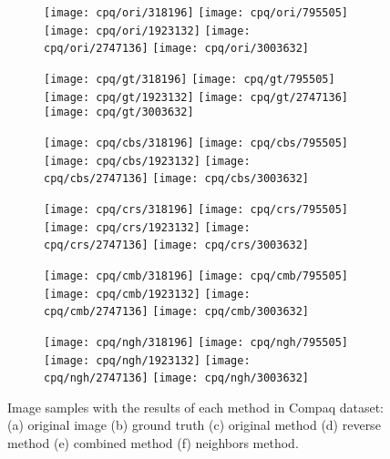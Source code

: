 \begin{figure*}[!htb]
    \centering
    \begin{subfigure}[t]{0.15\textwidth}
        \texttt{[image: cpq/ori/318196]}
        \texttt{[image: cpq/ori/795505]}
        \texttt{[image: cpq/ori/1923132]}
        \texttt{[image: cpq/ori/2747136]}
        \texttt{[image: cpq/ori/3003632]}
        \caption{}
    \end{subfigure}
    \begin{subfigure}[t]{0.15\textwidth}
        \texttt{[image: cpq/gt/318196]}
        \texttt{[image: cpq/gt/795505]}
        \texttt{[image: cpq/gt/1923132]}
        \texttt{[image: cpq/gt/2747136]}
        \texttt{[image: cpq/gt/3003632]}
        \caption{}
    \end{subfigure}
    \begin{subfigure}[t]{0.15\textwidth}
        \texttt{[image: cpq/cbs/318196]}
        \texttt{[image: cpq/cbs/795505]}
        \texttt{[image: cpq/cbs/1923132]}
        \texttt{[image: cpq/cbs/2747136]}
        \texttt{[image: cpq/cbs/3003632]}
        \caption{}
    \end{subfigure}
    \begin{subfigure}[t]{0.15\textwidth}
        \texttt{[image: cpq/crs/318196]}
        \texttt{[image: cpq/crs/795505]}
        \texttt{[image: cpq/crs/1923132]}
        \texttt{[image: cpq/crs/2747136]}
        \texttt{[image: cpq/crs/3003632]}
        \caption{}
    \end{subfigure}
    \begin{subfigure}[t]{0.15\textwidth}
        \texttt{[image: cpq/cmb/318196]}
        \texttt{[image: cpq/cmb/795505]}
        \texttt{[image: cpq/cmb/1923132]}
        \texttt{[image: cpq/cmb/2747136]}
        \texttt{[image: cpq/cmb/3003632]}
        \caption{}
    \end{subfigure}
    \begin{subfigure}[t]{0.15\textwidth}
        \texttt{[image: cpq/ngh/318196]}
        \texttt{[image: cpq/ngh/795505]}
        \texttt{[image: cpq/ngh/1923132]}
        \texttt{[image: cpq/ngh/2747136]}
        \texttt{[image: cpq/ngh/3003632]}
        \caption{}
    \end{subfigure}

    \caption[Image samples with the results of each method in Compaq dataset]{Image samples with the results of each method in Compaq dataset: (a) original image (b) ground truth (c) original method \cite{brancati:17} (d) reverse method (e) combined method (f) neighbors method.}
    \label{fig:results_cpq}
\end{figure*}
\clearpage

